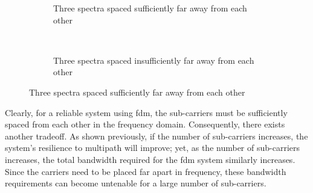 \documentclass[class=report,11pt,crop=false]{standalone}
\begin{document}
\begin{figure}[htbp]
    \centering
    \captionsetup{type=figure}
    \begin{subfigure}[t]{0.58\textwidth}
        \centering
        \def\svgwidth{1\linewidth}
        { %
        \tiny
            }
        \caption{Three spectra spaced sufficiently far away from each other}
        \label{fig:three-sincs-good-distance}
    \end{subfigure}
    ~
    \begin{subfigure}[t]{0.4\textwidth}
        \centering
        \def\svgwidth{1\linewidth}
        { %
        \tiny
            }
        \caption{Three spectra spaced insufficiently far away from each other}
        \label{fig:three-sincs-bad-distance}
    \end{subfigure}%
    \caption{Three spectra spaced sufficiently far away from each other}
    \label{fig:three-sincs-good-and-bad}
\end{figure}

Clearly, for a reliable system using \gls{fdm}, the sub-carriers must be sufficiently spaced from each other in the frequency domain. Consequently, there exists another tradeoff. As shown previously, if the number of sub-carriers increases, the system's resilience to multipath will improve; yet, as the number of sub-carriers increases, the total bandwidth required for the \gls{fdm} system similarly increases. Since the carriers need to be placed far apart in frequency, these bandwidth requirements can become untenable for a large number of sub-carriers. 
  
\end{document}
